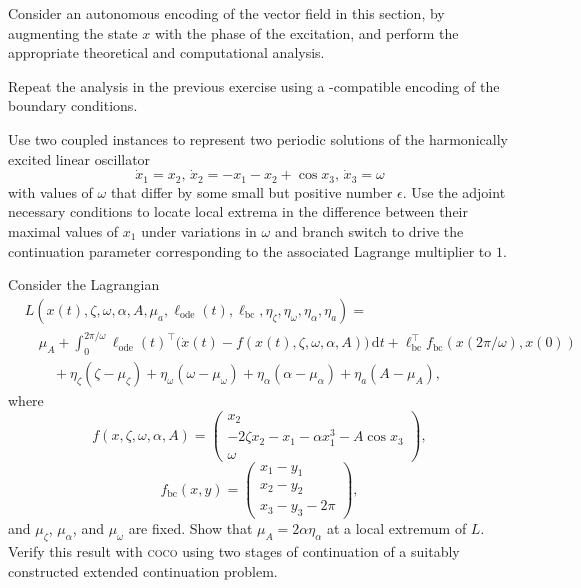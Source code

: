 \begin{exercises}
\item Consider an autonomous encoding of the vector field in this section, by augmenting the state $x$ with the phase of the excitation, and perform the appropriate theoretical and computational analysis.
\item Repeat the analysis in the previous exercise using a -compatible encoding of the boundary conditions.
\item Use two coupled  instances to represent two periodic solutions of the harmonically excited linear oscillator
\[
\dot{x}_1=x_2,\,\dot{x}_2=-x_1-x_2+\cos x_3,\,\dot{x}_3=\omega
\]
with values of $\omega$ that differ by some small but positive number $\epsilon$. Use the adjoint necessary conditions to locate local extrema in the difference between their maximal values of $x_1$ under variations in $\omega$ and branch switch to drive the continuation parameter corresponding to the associated Lagrange multiplier to $1$.
\item Consider the Lagrangian
\begin{align*}
&L\left(x(t),\zeta,\omega,\alpha,A,\mu_a,\ell_\mathrm{ode}(t),\ell_\mathrm{bc},\eta_\zeta,\eta_\omega, \eta_\alpha, \eta_a\right)=\\
&\quad\mu_A+\int_0^{2\pi/\omega}\ell_\mathrm{ode}(t)^\top\big(\dot{x}(t)-f(x(t),\zeta,\omega,\alpha,A)\big)\,\mathrm{d}t+\ell_{\mathrm{bc}}^\top f_\mathrm{bc}(x(2\pi/\omega),x(0))\\
&\quad\quad+\eta_\zeta\left(\zeta-\mu_\zeta\right)+\eta_\omega\left(\omega-\mu_\omega\right)+\eta_\alpha\left(\alpha-\mu_\alpha\right)+\eta_a\left(A-\mu_A\right),
\end{align*}
where
\[
f(x,\zeta,\omega,\alpha,A)=\left(\begin{array}{c}x_2\\-2\zeta x_2-x_1-\alpha x_1^3-A\cos x_3\\\omega\end{array}\right),
\]
\[
f_\mathrm{bc}(x,y)=\left(\begin{array}{c}x_1-y_1\\x_2-y_2\\x_3-y_3-2\pi\end{array}\right),
\]
and $\mu_\zeta$, $\mu_\alpha$, and $\mu_\omega$ are fixed. Show that $\mu_A=2\alpha\eta_\alpha$ at a local extremum of $L$. Verify this result with \textsc{coco} using two stages of continuation of a suitably constructed extended continuation problem.
\end{exercises}

